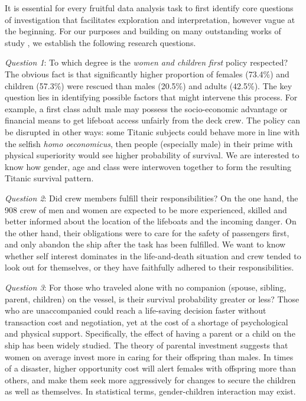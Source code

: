 \documentclass[]{interact}
\theoremstyle{plain}%
\theoremstyle{definition}
\theoremstyle{remark}
\begin{document}
It is essential for every fruitful data analysis task to first identify core questions of investigation that facilitates exploration and interpretation, however vague at the beginning. For our purposes and building on many outstanding works of study \citetext{\citeyear{gleicher2004survived}; \citeyear{frey2009surviving}; \citeyear{symanzikunsinkable}}, we establish the following research questions.

\hfill\break

\emph{Question 1}: To which degree is the \emph{women and children first} policy respected? The obvious fact is that significantly higher proportion of females (73.4\%) and children (57.3\%) were rescued than males (20.5\%) and adults (42.5\%). The key question lies in identifying possible factors that might intervene this process. For example, a first class adult male may possess the socio-economic advantage or financial means to get lifeboat access unfairly from the deck crew. The policy can be disrupted in other ways: some Titanic subjects could behave more in line with the selfish \emph{homo oeconomicus}, then people (especially male) in their prime with physical superiority would see higher probability of survival. We are interested to know how gender, age and class were interwoven together to form the resulting Titanic survival pattern.

\emph{Question 2}: Did crew members fulfill their responsibilities? On the one hand, the 908 crew of men and women are expected to be more experienced, skilled and better informed about the location of the lifeboats and the incoming danger. On the other hand, their obligations were to care for the safety of passengers first, and only abandon the ship after the task has been fulfilled. We want to know whether self interest dominates in the life-and-death situation and crew tended to look out for themselves, or they have faithfully adhered to their responsibilities.

\emph{Question 3}: For those who traveled alone with no companion (spouse, sibling, parent, children) on the vessel, is their survival probability greater or less? Those who are unaccompanied could reach a life-saving decision faster without transaction cost and negotiation, yet at the cost of a shortage of psychological and physical support. Specifically, the effect of having a parent or a child on the ship has been widely studied. The theory of parental investment suggests that women on average invest more in caring for their offspring than males. In times of a disaster, higher opportunity cost will alert females with offspring more than others, and make them seek more aggressively for changes to secure the children as well as themselves. In statistical terms, gender-children interaction may exist.
\end{document}
